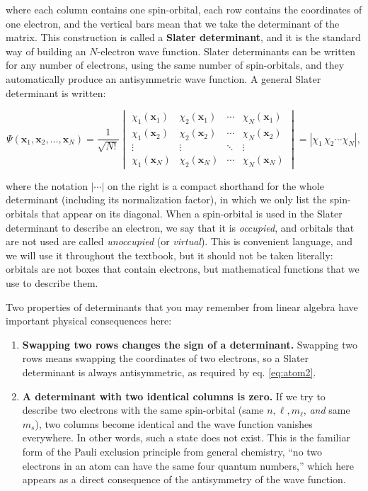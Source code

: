 \documentclass[
  english,
  9pt,
]{extbook}
\providecommand{\tightlist}{%
  \setlength{\itemsep}{0pt}\setlength{\parskip}{0pt}}
\theoremstyle{definition}
\theoremstyle{definition}
\theoremstyle{definition}
\theoremstyle{definition}
\theoremstyle{remark}
\begin{document}
where each column contains one spin-orbital, each row contains the coordinates of one electron, and the vertical bars mean that we take the determinant of the matrix. This construction is called a \textbf{Slater determinant}, and it is the standard way of building an \(N\)-electron wave function. Slater determinants can be written for any number of electrons, using the same number of spin-orbitals, and they automatically produce an antisymmetric wave function. A general Slater determinant is written:

\begin{equation}
\Psi (\mathbf{x} _{1},\mathbf{x} _{2},\ldots ,\mathbf{x} _{N})={\frac {1}{\sqrt {N!}}}{\begin{vmatrix}\chi _{1}(\mathbf{x} _{1})&\chi _{2}(\mathbf{x} _{1})&\cdots &\chi _{N}(\mathbf{x} _{1})\\\chi _{1}(\mathbf{x} _{2})&\chi _{2}(\mathbf{x} _{2})&\cdots &\chi _{N}(\mathbf{x} _{2})\\\vdots &\vdots &\ddots &\vdots \\\chi _{1}(\mathbf{x} _{N})&\chi _{2}(\mathbf{x} _{N})&\cdots &\chi _{N}(\mathbf{x} _{N})\end{vmatrix}} = |\chi _{1}\,\chi _{2}\cdots \chi _{N}|,
\label{eq:atom8}
\end{equation}

where the notation \(|\cdots|\) on the right is a compact shorthand for the whole determinant (including its normalization factor), in which we only list the spin-orbitals that appear on its diagonal. When a spin-orbital is used in the Slater determinant to describe an electron, we say that it is \emph{occupied}, and orbitals that are not used are called \emph{unoccupied} (or \emph{virtual}). This is convenient language, and we will use it throughout the textbook, but it should not be taken literally: orbitals are not boxes that contain electrons, but mathematical functions that we use to describe them.

Two properties of determinants that you may remember from linear algebra have important physical consequences here:

\begin{enumerate}
\def\labelenumi{\arabic{enumi}.}
\tightlist
\item
  \textbf{Swapping two rows changes the sign of a determinant.} Swapping two rows means swapping the coordinates of two electrons, so a Slater determinant is always antisymmetric, as required by eq. \eqref{eq:atom2}.
\item
  \textbf{A determinant with two identical columns is zero.} If we try to describe two electrons with the same spin-orbital (same \(n,\ell,m_\ell\), \emph{and} same \(m_s\)), two columns become identical and the wave function vanishes everywhere. In other words, such a state does not exist. This is the familiar form of the Pauli exclusion principle from general chemistry, ``no two electrons in an atom can have the same four quantum numbers,'' which here appears as a direct consequence of the antisymmetry of the wave function.
\end{enumerate}
\end{document}
